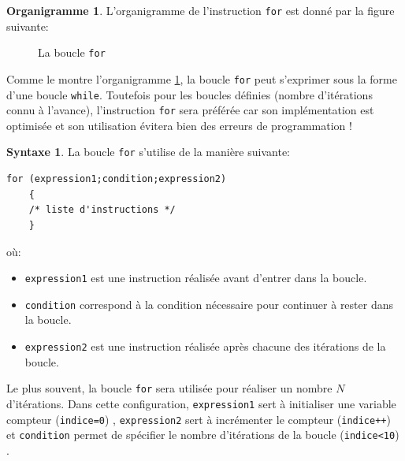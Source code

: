 \documentclass[a4paper,11pt]{book}
\theoremstyle{definition}
\newtheorem*{syntaxe}{Syntaxe}
\newtheorem*{org}{Organigramme}
\begin{document}
\begin{org}L'organigramme de l'instruction \texttt{for} est donné par la figure suivante:
\begin{figure}[!h]
\centering
{}
\caption{La boucle \texttt{for}\label{org_for}}
\end{figure}

Comme le montre l'organigramme \ref{org_for}, la boucle \texttt{for} peut s'exprimer sous la forme d'une boucle \texttt{while}. Toutefois pour les boucles définies (nombre d'itérations connu à l'avance), l'instruction \texttt{for} sera préférée car son implémentation est optimisée et son utilisation évitera bien des erreurs de programmation !
\end{org}

\begin{syntaxe}La boucle \texttt{for} s'utilise de la manière suivante:
\begin{lstlisting}
for (expression1;condition;expression2)
    {
    /* liste d'instructions */
    }
\end{lstlisting}
où:
\begin{itemize}
\item \texttt{expression1} est une instruction réalisée avant d'entrer dans la boucle.
\item \texttt{condition} correspond à la condition nécessaire pour continuer à rester dans la boucle.
\item \texttt{expression2} est une instruction réalisée après chacune des itérations de la boucle.\\
\end{itemize}
Le plus souvent, la boucle \texttt{for} sera utilisée pour réaliser un nombre $N$ d'itérations. Dans cette configuration, \texttt{expression1} sert à initialiser une variable compteur (\texttt{indice=0}) , \texttt{expression2} sert à incrémenter le compteur (\texttt{indice++}) et \texttt{condition} permet de spécifier le nombre d'itérations de la boucle (\texttt{indice<10}) .
\end{syntaxe}
\end{document}
